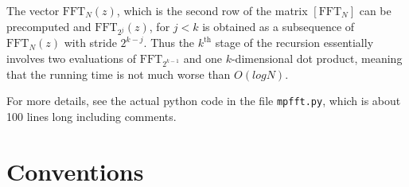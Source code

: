 \documentclass[12pt, letter, oneside]{amsart}
\theoremstyle{definition}
\theoremstyle{plain}
\numberwithin{equation}{para}
\numberwithin{figure}{section}
\newcommand{\FFT}{\text{FFT}}
\renewcommand{\th}{\text{th}}
\begin{document}
The vector $\FFT_N(z)$, which is the second row of the matrix $[\FFT_N]$ can
be precomputed and $\FFT_{2^j}(z)$, for $j < k$ is obtained as a subsequence
of $\FFT_N(z)$ with stride $2^{k-j}$.  Thus the $k^\th$ stage of the recursion
essentially involves two evaluations of $\FFT_{2^{k-1}}$ and one $k$-dimensional
dot product, meaning that the running time is not much worse than $O(log N)$.

For more details, see the actual python code in the file {\tt mpfft.py}, which
is about 100 lines long including comments.

\section{Conventions}
  
\end{document}
